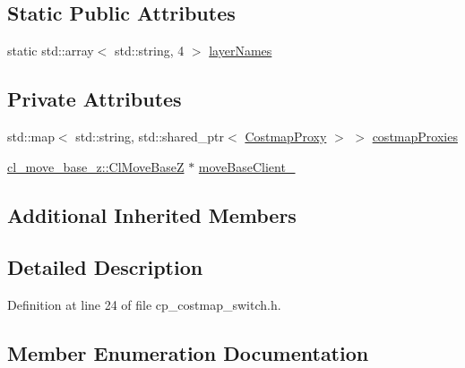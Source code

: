 \subsection*{Static Public Attributes}
\begin{DoxyCompactItemize}
\item 
static std\+::array$<$ std\+::string, 4 $>$ \hyperlink{classcl__move__base__z_1_1CostmapSwitch_aee0c75c8f4459cacaf583ef8c90ff329}{layer\+Names}
\end{DoxyCompactItemize}
\subsection*{Private Attributes}
\begin{DoxyCompactItemize}
\item 
std\+::map$<$ std\+::string, std\+::shared\+\_\+ptr$<$ \hyperlink{classcl__move__base__z_1_1CostmapProxy}{Costmap\+Proxy} $>$ $>$ \hyperlink{classcl__move__base__z_1_1CostmapSwitch_a3a574ac1f7f3eff19cdf7ad0e15297e4}{costmap\+Proxies}
\item 
\hyperlink{classcl__move__base__z_1_1ClMoveBaseZ}{cl\+\_\+move\+\_\+base\+\_\+z\+::\+Cl\+Move\+BaseZ} $\ast$ \hyperlink{classcl__move__base__z_1_1CostmapSwitch_acf03e8e1bb0ce2117b1a081ed0d073dd}{move\+Base\+Client\+\_\+}
\end{DoxyCompactItemize}
\subsection*{Additional Inherited Members}


\subsection{Detailed Description}


Definition at line 24 of file cp\+\_\+costmap\+\_\+switch.\+h.



\subsection{Member Enumeration Documentation}
\mbox{\label{classcl__move__base__z_1_1CostmapSwitch_af38aeee5e3893e689cd74ddddfe0df15}} 

